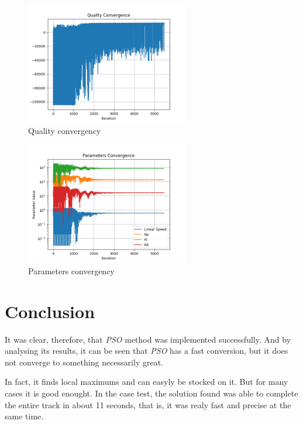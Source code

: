 \begin{figure}
  \begin{center}
  \includegraphics[width=2.8in]{./../code/results/line_quality_convergence.png}
  \caption{Quality convergency}
  \label{img:quality_converge}
  \end{center}
\end{figure}

\begin{figure}
  \begin{center}
  \includegraphics[width=2.8in]{./../code/results/line_parameters_convergence.png}
  \caption{Parameters convergency}
  \label{img:parameters_quality_converge}
  \end{center}
\end{figure}

\section {Conclusion}

It was clear, therefore, that \textit{PSO} method was implemented successfully. And by analysing its results, it can be seen that \textit{PSO} has a fast conversion, but it does not converge to something necessarily great.

In fact, it finds local maximums and can easyly be stocked on it. But for many cases it is good enought. In the case test, the solution found was able to complete the entire track in about 11 seconds, that is, it was realy fast and precise at the same time.

